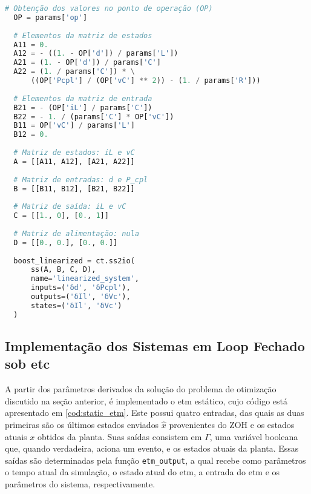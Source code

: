 \vspace{8pt}
\begin{lstlisting}[language=Python, caption={Implementação do conversor Boost linearizado.}, label=cod:boost_linear]
  # Obtenção dos valores no ponto de operação (OP)
  OP = params['op']
  
  # Elementos da matriz de estados
  A11 = 0.
  A12 = - ((1. - OP['d']) / params['L'])
  A21 = (1. - OP['d']) / params['C']
  A22 = (1. / params['C']) * \
      ((OP['Pcpl'] / (OP['vC'] ** 2)) - (1. / params['R']))
  
  # Elementos da matriz de entrada
  B21 = - (OP['iL'] / params['C'])
  B22 = - 1. / (params['C'] * OP['vC'])
  B11 = OP['vC'] / params['L']
  B12 = 0.
  
  # Matriz de estados: iL e vC
  A = [[A11, A12], [A21, A22]]
  
  # Matriz de entradas: d e P_cpl
  B = [[B11, B12], [B21, B22]]
  
  # Matriz de saída: iL e vC
  C = [[1., 0], [0., 1]]
  
  # Matriz de alimentação: nula
  D = [[0., 0.], [0., 0.]]
  
  boost_linearized = ct.ss2io(
      ss(A, B, C, D),
      name='linearized_system',
      inputs=('δd', 'δPcpl'),
      outputs=('δIl', 'δVc'),
      states=('δIl', 'δVc')
  )
\end{lstlisting}

\subsection{Implementação dos Sistemas em Loop Fechado sob \acrshort{etc}}


A partir dos parâmetros derivados da solução do problema de otimização discutido na seção anterior, é implementado o \acrshort{etm} estático, cujo código está apresentado em \ref{cod:static_etm}. Este possui quatro entradas, das quais as duas primeiras são os últimos estados enviados $\hat{x}$ provenientes do ZOH e os estados atuais $x$ obtidos da planta. Suas saídas consistem em $\Gamma$, uma variável booleana que, quando verdadeira, aciona um evento, e os estados atuais da planta. Essas saídas são determinadas pela função \texttt{etm\_output}, a qual recebe como parâmetros o tempo atual da simulação, o estado atual do \acrshort{etm}, a entrada do \acrshort{etm} e os parâmetros do sistema, respectivamente.

